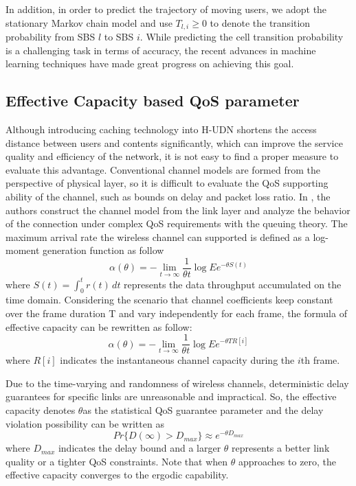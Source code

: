 \documentclass[conference]{IEEEtran}
\begin{document}
In addition, in order to predict the trajectory of moving users, we adopt the stationary Markov chain model and use $T_{l,i}\ge 0$ to denote the transition probability from SBS $l$ to SBS $i$. While predicting the cell transition probability is a challenging task in terms of accuracy, the recent advances in machine learning techniques have made great progress on achieving this goal.

\subsection{Effective Capacity based QoS parameter}
Although introducing caching technology into H-UDN shortens the access distance between users and contents significantly, which can improve the service quality and efficiency of the network, it is not easy to find a proper measure to evaluate this advantage. Conventional channel models are formed from the perspective of physical layer, so it is difficult to evaluate the QoS supporting ability of the channel, such as bounds on delay and packet loss ratio. In \cite{1210731}, the authors construct the channel model from the link layer and analyze the behavior of the connection under complex QoS requirements with the queuing theory. The maximum arrival rate the wireless channel can supported is defined as a log-moment generation function as follow
\begin{equation}
\alpha(\theta)=-\lim_{t \to \infty}\frac{1}{\theta t}\log E{e^{-\theta S(t)}}
\end{equation}
where $S(t)=\int_{0}^{t} r(t)\, dt$ represents the data throughput accumulated on the time domain. Considering the scenario that channel coefficients keep constant over the frame duration T and vary independently for each frame, the formula of effective capacity can be rewritten as follow:
\begin{equation}
\alpha(\theta)=-\lim_{t \to \infty}\frac{1}{\theta t}\log E{e^{-\theta TR[i]}}
\end{equation}
where $R[i]$ indicates the instantaneous channel capacity during the $i$th frame.

Due to the time-varying and randomness of wireless channels, deterministic delay guarantees for specific links are unreasonable and impractical. So, the effective capacity denotes
$\theta$as the statistical QoS guarantee parameter and the delay violation possibility can be written as
\begin{equation}
Pr\{D(\infty)>D_{max}\}\approx e^{-\theta D_{max}}
\end{equation}
where $D_{max}$ indicates the delay bound and a larger $\theta$ represents a better link quality or a tighter QoS constraints. Note that when $\theta$ approaches to zero, the effective capacity converges to the ergodic capability.
\end{document}
